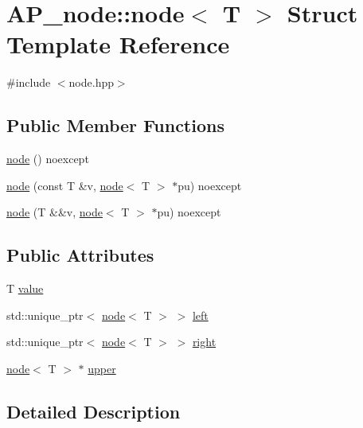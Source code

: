\hypertarget{structAP__node_1_1node}{}\section{A\+P\+\_\+node\+:\+:node$<$ T $>$ Struct Template Reference}
\label{structAP__node_1_1node}


{\ttfamily \#include $<$node.\+hpp$>$}

\subsection*{Public Member Functions}
\begin{DoxyCompactItemize}
\item 
\hyperlink{structAP__node_1_1node_aacecb07aeda049c5b310c6178fd024dc}{node} () noexcept
\item 
\hyperlink{structAP__node_1_1node_a364c333ccf25b7f1c4ac766a23e86ee6}{node} (const T \&v, \hyperlink{structAP__node_1_1node}{node}$<$ T $>$ $\ast$pu) noexcept
\item 
\hyperlink{structAP__node_1_1node_a548c79adaea5073dccf7283a7a511aac}{node} (T \&\&v, \hyperlink{structAP__node_1_1node}{node}$<$ T $>$ $\ast$pu) noexcept
\end{DoxyCompactItemize}
\subsection*{Public Attributes}
\begin{DoxyCompactItemize}
\item 
T \hyperlink{structAP__node_1_1node_abbde5206a54167ba046551879f409134}{value}
\item 
std\+::unique\+\_\+ptr$<$ \hyperlink{structAP__node_1_1node}{node}$<$ T $>$ $>$ \hyperlink{structAP__node_1_1node_adde34e7c4d3d99dc9515c0c38e117e0a}{left}
\item 
std\+::unique\+\_\+ptr$<$ \hyperlink{structAP__node_1_1node}{node}$<$ T $>$ $>$ \hyperlink{structAP__node_1_1node_ab55fa203db8ddff7144bb2e4c1a336fc}{right}
\item 
\hyperlink{structAP__node_1_1node}{node}$<$ T $>$ $\ast$ \hyperlink{structAP__node_1_1node_acadd81185b4232098b48eb317e105007}{upper}
\end{DoxyCompactItemize}


\subsection{Detailed Description}
